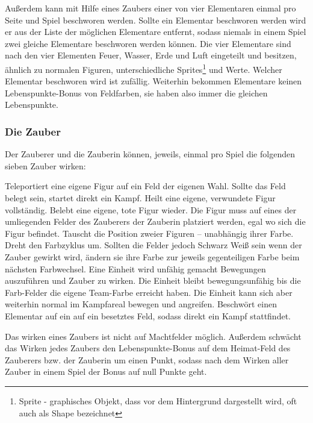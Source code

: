 Außerdem kann mit Hilfe eines Zaubers einer von vier Elementaren einmal pro Seite und Spiel beschworen werden. Sollte ein Elementar beschworen werden wird er aus der Liste der möglichen Elementare entfernt, sodass niemals in einem Spiel zwei gleiche Elementare beschworen werden können. Die vier Elementare sind nach den vier Elementen Feuer, Wasser, Erde und Luft eingeteilt und besitzen, ähnlich zu normalen Figuren, unterschiedliche Sprites\footnote{Sprite - graphisches Objekt, dass vor dem Hintergrund dargestellt wird, oft auch als Shape bezeichnet} und Werte. Welcher Elementar beschworen wird ist zufällig. Weiterhin bekommen Elementare keinen Lebenspunkte-Bonus von Feldfarben, sie haben also immer die gleichen Lebenspunkte.

\subsubsection{Die Zauber}
Der Zauberer und die Zauberin können, jeweils, einmal pro Spiel die folgenden sieben Zauber wirken:
\begin{itemize}
	Teleportiert eine eigene Figur auf ein Feld der eigenen Wahl. Sollte das Feld belegt sein, startet direkt ein Kampf.
	Heilt eine eigene, verwundete Figur vollständig.
	Belebt eine eigene, tote Figur wieder. Die Figur muss auf eines der umliegenden Felder des Zauberers \bzw der Zauberin platziert werden, egal wo sich die Figur befindet.
	Tauscht die Position zweier Figuren -- unabhängig ihrer Farbe.
	Dreht den Farbzyklus um. Sollten die Felder jedoch Schwarz \bzw Weiß sein wenn der Zauber gewirkt wird, ändern sie ihre Farbe zur jeweils gegenteiligen Farbe beim nächsten Farbwechsel.
	Eine Einheit wird unfähig gemacht Bewegungen auszuführen und Zauber zu wirken. Die Einheit bleibt bewegungsunfähig bis die Farb-Felder die eigene Team-Farbe erreicht haben. Die Einheit kann sich aber weiterhin normal im Kampfareal bewegen und angreifen.
	Beschwört einen Elementar auf ein auf ein besetztes Feld, sodass direkt ein Kampf stattfindet.
\end{itemize}
Das wirken eines Zaubers ist nicht auf Machtfelder möglich. Außerdem schwächt das Wirken jedes Zaubers den Lebenspunkte-Bonus auf dem Heimat-Feld des Zauberers bzw. der Zauberin um einen Punkt, sodass nach dem Wirken aller Zauber in einem Spiel der Bonus auf null Punkte geht.

